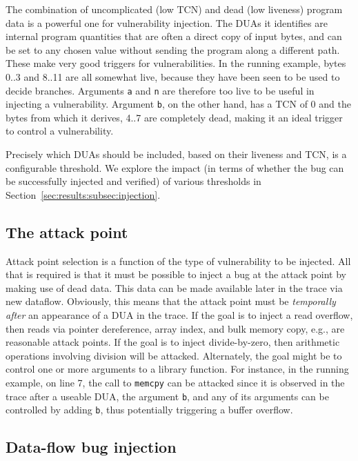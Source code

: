 The combination of uncomplicated (low TCN) and dead (low liveness) program data is a powerful one for vulnerability injection.
The DUAs it identifies are internal program quantities that are often a direct copy of input bytes, and can be set to any chosen value without sending the program along a different path.  
These make very good triggers for vulnerabilities.
In the running example, bytes 0..3 and 8..11 are all somewhat live, because they have been seen to be used to decide branches.
Arguments \verb+a+ and \verb+n+ are therefore too live to be useful in injecting a vulnerability.
Argument \verb+b+, on the other hand, has a TCN of 0 and the bytes from which it derives, 4..7 are completely dead, 
making it an ideal trigger to control a vulnerability. 

Precisely which DUAs should be included, based on their liveness and TCN, is a configurable threshold. We explore the impact (in terms of whether the bug can be successfully injected and verified) of various thresholds in Section~\ref{sec:results:subsec:injection}.

\subsection {The attack point}

Attack point selection is a function of the type of vulnerability to be injected.
All that is required is that it must be possible to inject a bug at the attack point by making use of dead data.
This data can be made available later in the trace via new dataflow.
Obviously, this means that the attack point must be \emph{temporally after} an appearance of a DUA in the trace.
If the goal is to inject a read overflow, then reads via pointer dereference, array index, and bulk memory copy, e.g., are reasonable attack points.  
If the goal is to inject divide-by-zero, then arithmetic operations involving division will be attacked. 
Alternately, the goal might be to control one or more arguments to a library function.
For instance, in the running example, on line 7, the call to \verb+memcpy+ can be attacked since it is observed in the trace after a useable DUA, the argument \verb+b+, and any of its arguments can be controlled by adding \verb+b+, thus potentially triggering a buffer overflow. 

\subsection {Data-flow bug injection}

